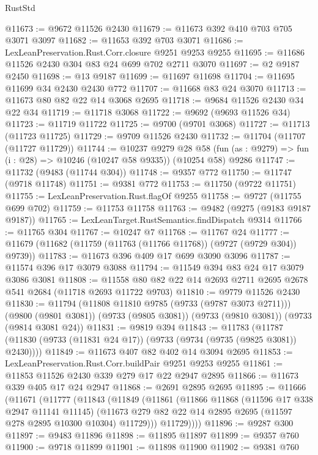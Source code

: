\begin{lexlean}{RustStd}
\begin{coremodule}
@11673 := @9672 @11526 @2430
@11679 := @11673 @392 @410 @703 @705 @3071 @3097
@11682 := @11653 @392 @703 @3071
@11686 := LexLeanPreservation.Rust.Corr.closure @9251 @9253 @9255
@11695 := @11686 @11526 @2430 @304 @83 @24 @699 @702 @2711 @3070
@11697 := @2 @9187 @2450
@11698 := @13 @9187
@11699 := @11697 @11698
@11704 := @11695 @11699 @34 @2430 @2430 @772
@11707 := @11668 @83 @24 @3070
@11713 := @11673 @80 @82 @22 @14 @3068 @2695
@11718 := @9684 @11526 @2430 @34 @22 @34
@11719 := @11718 @3068
@11722 := @9692 (@9693 @11526 @34)
@11723 := @11719 @11722
@11725 := @9700 (@9701 @3068)
@11727 := @11713 (@11723 @11725)
@11729 := @9709 @11526 @2430
@11732 := @11704 (@11707 (@11727 @11729))
@11744 := @10237
    @9279
    @28
    @58
    (fun (as : @9279) => fun (i : @28) => @10246 (@10247 @58 @9335))
    (@10254 @58)
    @9286
@11747 := @11732 (@9483 (@11744 @304))
@11748 := @9357 @772
@11750 := @11747 (@9718 @11748)
@11751 := @9381 @772
@11753 := @11750 (@9722 @11751)
@11755 := LexLeanPreservation.Rust.flagOf @9255
@11758 := @9727 (@11755 @699 @702)
@11759 := @11753 @11758
@11763 := @9482 (@9275 (@9183 @9187 @9187))
@11765 := LexLeanTarget.RustSemantics.findDispatch @9314
@11766 := @11765 @304
@11767 := @10247 @7
@11768 := @11767 @24
@11777 := @11679 (@11682 (@11759 (@11763 (@11766 @11768)) (@9727 (@9729 @304)) @9739))
@11783 := @11673 @396 @409 @17 @699 @3090 @3096
@11787 := @11574 @396 @17 @3079 @3088
@11794 := @11549 @394 @83 @24 @17 @3079 @3086 @3081
@11808 := @11558 @80 @82 @22 @14 @2693 @2711 @2695 @2678 @541 @2684 (@11718 @2693 @11722 @9703)
@11810 := @9779 @11526 @2430
@11830 := @11794
    (@11808 @11810 @9785 (@9733 (@9787 @3073 @2711)))
    (@9800 (@9801 @3081))
    (@9733 (@9805 @3081))
    (@9733 (@9810 @3081))
    (@9733 (@9814 @3081 @24))
@11831 := @9819 @394
@11843 := @11783
    (@11787 (@11830 (@9733 (@11831 @24 @17)) (@9733 (@9734 (@9735 (@9825 @3081)) @2430))))
@11849 := @11673 @407 @82 @402 @14 @3094 @2695
@11853 := LexLeanPreservation.Rust.Corr.buildPair @9251 @9253 @9255
@11861 := @11853 @11526 @2430 @339 @279 @17 @22 @2947 @2895
@11866 := @11673 @339 @405 @17 @24 @2947
@11868 := @2691 @2895 @2695
@11895 := @11666
    (@11671
      (@11777
        (@11843
          (@11849
            (@11861
              (@11866
                @11868
                (@11596 @17 @338 @2947 @11141 @11145)
                (@11673 @279 @82 @22 @14 @2895 @2695 (@11597 @278 @2895 @10300 @10304) @11729)))
            @11729))))
@11896 := @9287 @300
@11897 := @9483 @11896
@11898 := @11895 @11897
@11899 := @9357 @760
@11900 := @9718 @11899
@11901 := @11898 @11900
@11902 := @9381 @760

\end{coremodule}
\end{lexlean}

